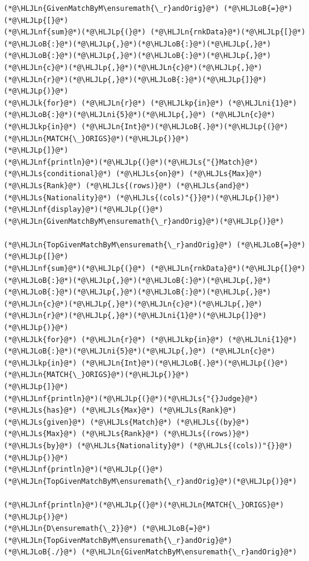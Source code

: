 \documentclass[12pt,a4paper]{article}
\newcommand{\HLJLk}[1]{\textcolor[RGB]{148,91,176}{\textbf{#1}}}
\newcommand{\HLJLkp}[1]{\textcolor[RGB]{148,91,176}{\textbf{#1}}}
\newcommand{\HLJLn}[1]{#1}
\newcommand{\HLJLnf}[1]{\textcolor[RGB]{66,102,213}{#1}}
\newcommand{\HLJLs}[1]{\textcolor[RGB]{201,61,57}{#1}}
\newcommand{\HLJLni}[1]{\textcolor[RGB]{59,151,46}{#1}}
\newcommand{\HLJLoB}[1]{\textcolor[RGB]{102,102,102}{\textbf{#1}}}
\newcommand{\HLJLp}[1]{#1}
\begin{document}
\begin{lstlisting}
(*@\HLJLn{GivenMatchByM\ensuremath{\_r}andOrig}@*) (*@\HLJLoB{=}@*) (*@\HLJLp{[}@*) 
(*@\HLJLnf{sum}@*)(*@\HLJLp{(}@*) (*@\HLJLn{rnkData}@*)(*@\HLJLp{[}@*)(*@\HLJLoB{:}@*)(*@\HLJLp{,}@*)(*@\HLJLoB{:}@*)(*@\HLJLp{,}@*)(*@\HLJLoB{:}@*)(*@\HLJLp{,}@*)(*@\HLJLoB{:}@*)(*@\HLJLp{,}@*)(*@\HLJLn{c}@*)(*@\HLJLp{,}@*)(*@\HLJLn{c}@*)(*@\HLJLp{,}@*)(*@\HLJLn{r}@*)(*@\HLJLp{,}@*)(*@\HLJLoB{:}@*)(*@\HLJLp{]}@*) (*@\HLJLp{)}@*)
(*@\HLJLk{for}@*) (*@\HLJLn{r}@*) (*@\HLJLkp{in}@*) (*@\HLJLni{1}@*)(*@\HLJLoB{:}@*)(*@\HLJLni{5}@*)(*@\HLJLp{,}@*) (*@\HLJLn{c}@*) (*@\HLJLkp{in}@*) (*@\HLJLn{Int}@*)(*@\HLJLoB{.}@*)(*@\HLJLp{(}@*)(*@\HLJLn{MATCH{\_}ORIGS}@*)(*@\HLJLp{)}@*)
(*@\HLJLp{]}@*)
(*@\HLJLnf{println}@*)(*@\HLJLp{(}@*)(*@\HLJLs{"{}Match}@*) (*@\HLJLs{conditional}@*) (*@\HLJLs{on}@*) (*@\HLJLs{Max}@*) (*@\HLJLs{Rank}@*) (*@\HLJLs{(rows)}@*) (*@\HLJLs{and}@*) (*@\HLJLs{Nationality}@*) (*@\HLJLs{(cols)"{}}@*)(*@\HLJLp{)}@*)
(*@\HLJLnf{display}@*)(*@\HLJLp{(}@*)(*@\HLJLn{GivenMatchByM\ensuremath{\_r}andOrig}@*)(*@\HLJLp{)}@*)

(*@\HLJLn{TopGivenMatchByM\ensuremath{\_r}andOrig}@*) (*@\HLJLoB{=}@*) (*@\HLJLp{[}@*)
(*@\HLJLnf{sum}@*)(*@\HLJLp{(}@*) (*@\HLJLn{rnkData}@*)(*@\HLJLp{[}@*)(*@\HLJLoB{:}@*)(*@\HLJLp{,}@*)(*@\HLJLoB{:}@*)(*@\HLJLp{,}@*)(*@\HLJLoB{:}@*)(*@\HLJLp{,}@*)(*@\HLJLoB{:}@*)(*@\HLJLp{,}@*)(*@\HLJLn{c}@*)(*@\HLJLp{,}@*)(*@\HLJLn{c}@*)(*@\HLJLp{,}@*)(*@\HLJLn{r}@*)(*@\HLJLp{,}@*)(*@\HLJLni{1}@*)(*@\HLJLp{]}@*) (*@\HLJLp{)}@*)
(*@\HLJLk{for}@*) (*@\HLJLn{r}@*) (*@\HLJLkp{in}@*) (*@\HLJLni{1}@*)(*@\HLJLoB{:}@*)(*@\HLJLni{5}@*)(*@\HLJLp{,}@*) (*@\HLJLn{c}@*) (*@\HLJLkp{in}@*) (*@\HLJLn{Int}@*)(*@\HLJLoB{.}@*)(*@\HLJLp{(}@*)(*@\HLJLn{MATCH{\_}ORIGS}@*)(*@\HLJLp{)}@*)
(*@\HLJLp{]}@*)
(*@\HLJLnf{println}@*)(*@\HLJLp{(}@*)(*@\HLJLs{"{}Judge}@*) (*@\HLJLs{has}@*) (*@\HLJLs{Max}@*) (*@\HLJLs{Rank}@*) (*@\HLJLs{given}@*) (*@\HLJLs{Match}@*) (*@\HLJLs{(by}@*) (*@\HLJLs{Max}@*) (*@\HLJLs{Rank}@*) (*@\HLJLs{(rows)}@*) (*@\HLJLs{by}@*) (*@\HLJLs{Nationality}@*) (*@\HLJLs{(cols))"{}}@*)(*@\HLJLp{)}@*)
(*@\HLJLnf{println}@*)(*@\HLJLp{(}@*)(*@\HLJLn{TopGivenMatchByM\ensuremath{\_r}andOrig}@*)(*@\HLJLp{)}@*)

(*@\HLJLnf{println}@*)(*@\HLJLp{(}@*)(*@\HLJLn{MATCH{\_}ORIGS}@*)(*@\HLJLp{)}@*)
(*@\HLJLn{D\ensuremath{\_2}}@*) (*@\HLJLoB{=}@*) (*@\HLJLn{TopGivenMatchByM\ensuremath{\_r}andOrig}@*) (*@\HLJLoB{./}@*) (*@\HLJLn{GivenMatchByM\ensuremath{\_r}andOrig}@*)
\end{lstlisting}
\end{document}
